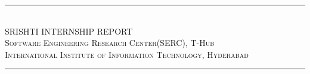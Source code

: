 \newcommand{\HRule}{\rule{\linewidth}{0.1mm}} 
\center %


\begin{figure}%
    \centering
    \hfill
    \vrule height 8em depth 5mm width 1pt
    \hspace{0.2\textwidth}
    \qquad
    
\end{figure}


\HRule \\[0.4cm]
{ \huge SRISHTI INTERNSHIP REPORT}\\[0.1cm] %
 
 \textsc{Software Engineering Research Center(SERC), T-Hub}\\[0.1cm]
 \textsc{International Institute of Information Technology, Hyderabad}
 \HRule \\[1.5cm]
 

